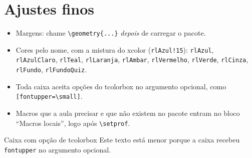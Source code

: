 \documentclass[11pt, a4paper]{article}
\begin{document}
\section{Ajustes finos}

\begin{itemize}
  \item Margens: chame \texttt{\textbackslash geometry\{...\}} \emph{depois} de
        carregar o pacote.
  \item Cores pelo nome, com a mistura do xcolor (\texttt{rlAzul!15}):
        \texttt{rlAzul}, \texttt{rlAzulClaro}, \texttt{rlTeal},
        \texttt{rlLaranja}, \texttt{rlAmbar}, \texttt{rlVermelho},
        \texttt{rlVerde}, \texttt{rlCinza}, \texttt{rlFundo},
        \texttt{rlFundoQuiz}.
  \item Toda caixa aceita opções do tcolorbox no argumento opcional, como
        \texttt{[fontupper=\textbackslash small]}.
  \item Macros que a aula precisar e que não existem no pacote entram no
        bloco ``Macros locais'', logo após \texttt{\textbackslash setprof}.
\end{itemize}

\begin{teobox}[fontupper=\small]{Caixa com opção de tcolorbox}
  Este texto está menor porque a caixa recebeu \texttt{fontupper} no argumento
  opcional.
\end{teobox}
\end{document}
